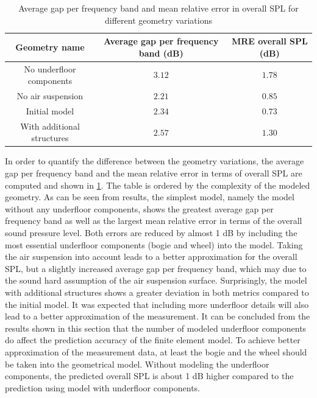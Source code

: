 \begin{table}[H]
	\centering
	\caption{Average gap per frequency band and mean relative error in overall SPL for different geometry variations}
	\label{tab:geometry_variation_MRE}
	\begin{tabular}{c|c|c}
		Geometry name              & Average gap per frequency band (dB) & MRE overall SPL (dB) \\ \hline
		No underfloor components   & $3.12$                       & $1.78$        \\
		No air suspension          & $2.21$                       & $0.85$        \\
		Initial model              & $2.34$                       & $0.73$        \\
		With additional structures & $2.57$                       & $1.30$       
	\end{tabular}
\end{table}

\noindent In order to quantify the difference between the geometry variations, the average gap per frequency band and the mean relative error in terms of overall SPL are computed and shown in \cref{tab:geometry_variation_MRE}. The table is ordered by the complexity of the modeled geometry. As can be seen from results, the simplest model, namely the model without any underfloor components, shows the greatest average gap per frequency band as well as the largest mean relative error in terms of the overall sound pressure level. Both errors are reduced by almost 1 dB by including the most essential underfloor components (bogie and wheel) into the model. Taking the air suspension into account leads to a better approximation for the overall SPL, but a slightly increased average gap per frequency band, which may due to the sound hard assumption of the air suspension surface. Surprisingly, the model with additional structures shows a greater deviation in both metrics compared to the initial model. It was expected that including more underfloor details will also lead to a better approximation of the measurement. It can be concluded from the results shown in this section that the number of modeled underfloor components do affect the prediction accuracy of the finite element model. To achieve better approximation of the measurement data, at least the bogie and the wheel should be taken into the geometrical model. Without modeling the underfloor components, the predicted overall SPL is about 1 dB higher compared to the prediction using model with underfloor components.


